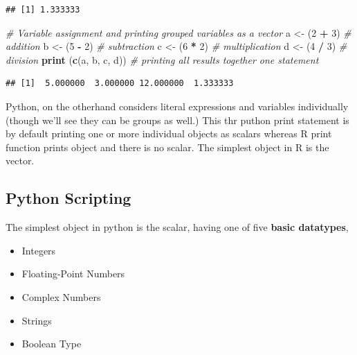 \documentclass[]{book}
\newenvironment{Shaded}{\begin{snugshade}}{\end{snugshade}}
\newcommand{\KeywordTok}[1]{\textcolor[rgb]{0.13,0.29,0.53}{\textbf{#1}}}
\newcommand{\DecValTok}[1]{\textcolor[rgb]{0.00,0.00,0.81}{#1}}
\newcommand{\StringTok}[1]{\textcolor[rgb]{0.31,0.60,0.02}{#1}}
\newcommand{\CommentTok}[1]{\textcolor[rgb]{0.56,0.35,0.01}{\textit{#1}}}
\newcommand{\OperatorTok}[1]{\textcolor[rgb]{0.81,0.36,0.00}{\textbf{#1}}}
\newcommand{\NormalTok}[1]{#1}
\providecommand{\tightlist}{%
  \setlength{\itemsep}{0pt}\setlength{\parskip}{0pt}}
\theoremstyle{definition}
\theoremstyle{definition}
\theoremstyle{definition}
\theoremstyle{remark}
\begin{document}
\begin{verbatim}
## [1] 1.333333
\end{verbatim}

\begin{Shaded}
\begin{Highlighting}[]
\CommentTok{# Variable assignment and printing grouped variables as a vector}
\NormalTok{a <-}\StringTok{ }\NormalTok{(}\DecValTok{2} \OperatorTok{+}\StringTok{ }\DecValTok{3}\NormalTok{)           }\CommentTok{# addition}
\NormalTok{b <-}\StringTok{ }\NormalTok{(}\DecValTok{5} \OperatorTok{-}\StringTok{ }\DecValTok{2}\NormalTok{)           }\CommentTok{# subtraction}
\NormalTok{c <-}\StringTok{ }\NormalTok{(}\DecValTok{6} \OperatorTok{*}\StringTok{ }\DecValTok{2}\NormalTok{)           }\CommentTok{# multiplication}
\NormalTok{d <-}\StringTok{ }\NormalTok{(}\DecValTok{4} \OperatorTok{/}\StringTok{ }\DecValTok{3}\NormalTok{)           }\CommentTok{# division}
\KeywordTok{print}\NormalTok{ (}\KeywordTok{c}\NormalTok{(a, b, c, d))  }\CommentTok{# printing all results together one statement}
\end{Highlighting}
\end{Shaded}

\begin{verbatim}
## [1]  5.000000  3.000000 12.000000  1.333333
\end{verbatim}

Python, on the otherhand considers literal expressions and variables
individually (though we'll see they can be groups as well.) This thr
puthon print statement is by default printing one or more individual
objects as scalars whereas R print function prints object and there is
no scalar. The simplest object in R is the vector.

\subsection{Python Scripting}\label{python-scripting}

The simplest object in python is the scalar, having one of five
\textbf{basic datatypes},

\begin{itemize}
\tightlist
\item
  Integers
\item
  Floating-Point Numbers
\item
  Complex Numbers
\item
  Strings
\item
  Boolean Type
\end{itemize}
\end{document}
